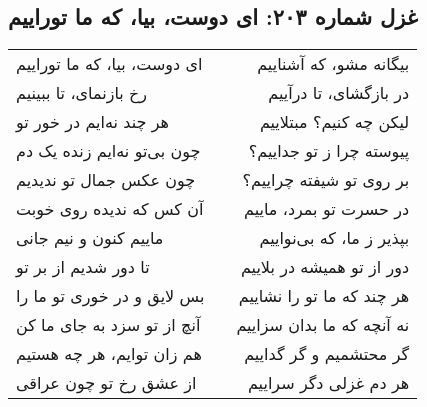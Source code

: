 \begin{center}
\section*{غزل شماره ۲۰۳: ای دوست، بیا، که ما توراییم}
\label{sec:203}
\begin{longtable}{l p{0.5cm} r}
ای دوست، بیا، که ما توراییم
&&
بیگانه مشو، که آشناییم
\\
رخ بازنمای، تا ببینیم
&&
در بازگشای، تا درآییم
\\
هر چند نه‌ایم در خور تو
&&
لیکن چه کنیم؟ مبتلاییم
\\
چون بی‌تو نه‌ایم زنده یک دم
&&
پیوسته چرا ز تو جداییم؟
\\
چون عکس جمال تو ندیدیم
&&
بر روی تو شیفته چراییم؟
\\
آن کس که ندیده روی خوبت
&&
در حسرت تو بمرد، ماییم
\\
ماییم کنون و نیم جانی
&&
بپذیر ز ما، که بی‌نواییم
\\
تا دور شدیم از بر تو
&&
دور از تو همیشه در بلاییم
\\
بس لایق و در خوری تو ما را
&&
هر چند که ما تو را نشاییم
\\
آنچ از تو سزد به جای ما کن
&&
نه آنچه که ما بدان سزاییم
\\
هم زان توایم، هر چه هستیم
&&
گر محتشمیم و گر گداییم
\\
از عشق رخ تو چون عراقی
&&
هر دم غزلی دگر سراییم
\\
\end{longtable}
\end{center}
